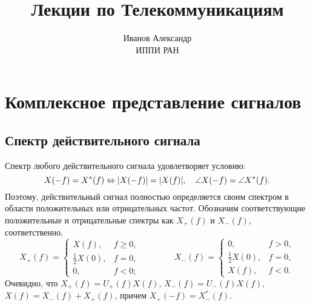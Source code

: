 \documentclass{book}
\numberwithin{theorem}{chapter}
\numberwithin{statement}{chapter}
\numberwithin{lemma}{chapter}
\theoremstyle{definition}
\numberwithin{task}{chapter}
\theoremstyle{remark}
\numberwithin{example}{chapter}
\theoremstyle{definition}
\numberwithin{definition}{chapter}
\theoremstyle{remark}
\theoremstyle{remark}
\numberwithin{lyrics}{section}
\begin{document}
\title{Лекции по Телекоммуникациям}
\author{Иванов Александр \\ ИППИ РАН}
\date{}
\maketitle
	
\tableofcontents
	





\chapter{Комплексное представление сигналов}
\section{Спектр действительного сигнала}
Спектр любого действительного сигнала удовлетворяет условию:
\begin{equation}
\notag
X(-f) = X^*(f) \Leftrightarrow |X(-f)| = |X(f)|,\quad \angle X(-f) = \angle X^*(f). 
\end{equation}
Поэтому, действительный сигнал полностью определяется своим спектром в области положительных или отрицательных частот. Обозначим соответствующие положительные и отрицательные спектры как $X_+(f)$ и $X_-(f)$, соответственно.
\begin{equation}
X_+(f) = 
\begin{cases}
X(f), & f \ge 0, \\
\frac{1}{2} X(0), & f = 0, \\
0, & f < 0;
\end{cases}
\qquad\qquad 
X_-(f) = 
\begin{cases}
0, & f > 0, \\
\frac{1}{2} X(0), & f = 0, \\
X(f), & f < 0.
\end{cases}
\end{equation}
Очевидно, что $X_+(f) = U_+(f) X(f)$, $X_-(f) = U_-(f) X(f)$, $X(f) = X_-(f) + X_+(f)$, причем $X_+(-f) = X_-^*(f)$.
\end{document}
